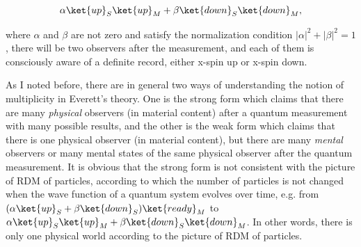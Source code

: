 \begin{equation}
\alpha \ket{up}_S \ket{up}_M+\beta \ket{down}_S \ket{down}_M,
\label{ss}
\end{equation}

\noindent  where $\alpha$ and $\beta$ are not zero and satisfy the normalization condition $|\alpha|^2+|\beta|^2=1$, there will be two observers after the measurement, and each of them is consciously aware of a definite record, either x-spin up or x-spin down. %

As I noted before, there are in general two ways of understanding the notion of multiplicity in Everett's theory.
One is the strong form which claims that there are many \emph{physical} observers (in material content) after a quantum measurement with many possible results, and the other is the weak form which claims that there is one physical observer (in material content), but there are many \emph{mental} observers or many mental states of the same physical observer after the quantum measurement.
It is obvious that the strong form is not consistent with the picture of RDM of particles, according to which the number of particles is not changed when the wave function of a quantum system evolves over time, e.g. from $ (\alpha \ket{up}_S+\beta \ket{down}_S)\ket{ready}_M$ to $\alpha \ket{up}_S \ket{up}_M+\beta \ket{down}_S \ket{down}_M$. In other words, there is only one physical world according to the picture of RDM of particles.

